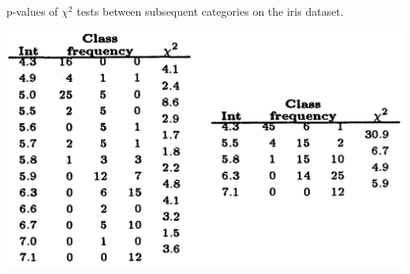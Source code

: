%

\begin{table}
\caption{\label{tab:chimerge_ex} p-values of $\chi^2$ tests between subsequent categories on the iris dataset.}
\centering
\includegraphics[width = .7\textwidth]{figures/appendix/tab_chimerge.PNG}
\end{table}


